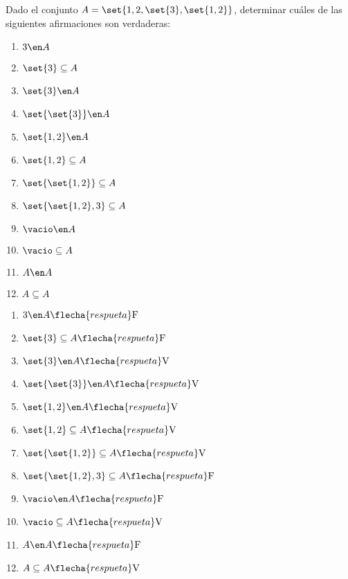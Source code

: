 \ejercicio

Dado el conjunto $A = \set{1,2,\set{3},\set{1,2}}$,
determinar cuáles de las siguientes afirmaciones son verdaderas:\\

\separadorCorto

\begin{multicols}{2}
	\begin{enumerate}[label=(\roman*)]
		\item $3 \en A         $
		\item $\set{3} \subseteq A $
		\item $\set{3} \en A    $
		\item $\set{\set{3}} \en A $
		\item $\set{1,2} \en A $
		\item $\set{1,2} \subseteq A  $
		\item $\set{\set{1,2}} \subseteq A  $
		\item $\set{\set{1,2}, 3} \subseteq A  $
		\item $\vacio \en A  $
		\item $\vacio \subseteq A  $
		\item $A \en A  $
		\item $A \subseteq A  $
	\end{enumerate}
\end{multicols}

\separadorCorto

\begin{multicols}{2}
	\begin{enumerate}[label=(\roman*)]
		\item $3 \en A       \flecha{respueta} \text{F}  $
		\item $\set{3} \subseteq A \flecha{respueta} \text{F}$
		\item $\set{3} \en A    \flecha{respueta} \text{V}$
		\item $\set{\set{3}} \en A \flecha{respueta} \text{V}$
		\item $\set{1,2} \en A \flecha{respueta} \text{V}$
		\item $\set{1,2} \subseteq A \flecha{respueta} \text{V} $
		\item $\set{\set{1,2}} \subseteq A \flecha{respueta} \text{V} $
		\item $\set{\set{1,2}, 3} \subseteq A \flecha{respueta} \text{F} $
		\item $\vacio \en A \flecha{respueta} \text{F} $
		\item $\vacio \subseteq A \flecha{respueta} \text{V} $
		\item $A \en A \flecha{respueta} \text{F} $
		\item $A \subseteq A \flecha{respueta} \text{V} $
	\end{enumerate}
\end{multicols}
